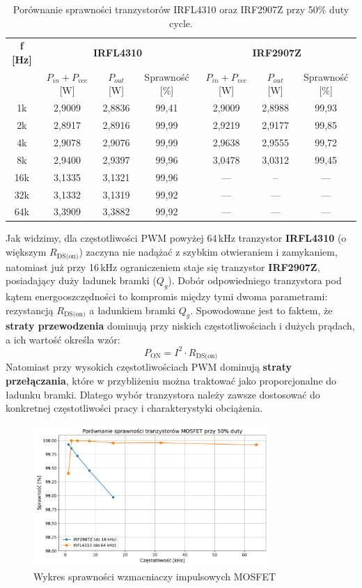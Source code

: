 \documentclass[11pt]{article}
\begin{document}
\begin{table}[H]
\centering
\begin{tabular}{|c|c|c|c|c|c|c|}
\hline
\textbf{f [Hz]} & \multicolumn{3}{c|}{\textbf{IRFL4310}} & \multicolumn{3}{c|}{\textbf{IRF2907Z}} \\
\cline{2-7}
 & $P_{in}+P_{vcc}$ [W] & $P_{out}$ [W] & Sprawność [\%] & $P_{in}+P_{vcc}$ [W] & $P_{out}$ [W] & Sprawność [\%] \\
\hline
1k   & 2,9009 & 2,8836 & 99,41 & 2,9009 & 2,8988 & 99,93 \\
\hline
2k   & 2,8917 & 2,8916 & 99,99 & 2,9219 & 2,9177 & 99,85 \\
\hline
4k   & 2,9078 & 2,9076 & 99,99 & 2,9638 & 2,9555 & 99,72 \\
\hline
8k   & 2,9400 & 2,9397 & 99,96 & 3,0478 & 3,0312 & 99,45 \\
\hline
16k  & 3,1335 & 3,1321 & 99,96 & --- & -- & --- \\
\hline
32k  & 3,1332 & 3,1319 & 99,92 & --- & --- & --- \\
\hline
64k  & 3,3909 & 3,3882 & 99,92 & --- & --- & --- \\
\hline
\end{tabular}
\caption{Porównanie sprawności tranzystorów IRFL4310 oraz IRF2907Z przy 50\% duty cycle.}
\end{table}

Jak widzimy, dla częstotliwości PWM powyżej 64\,kHz tranzystor \textbf{IRFL4310} (o większym $R_{\text{DS(on)}}$) zaczyna nie nadążać z szybkim otwieraniem i zamykaniem, natomiast już przy 16\,kHz ograniczeniem staje się tranzystor \textbf{IRF2907Z}, posiadający duży ładunek bramki ($Q_g$).
Dobór odpowiedniego tranzystora pod kątem energooszczędności to kompromis między tymi dwoma parametrami: rezystancją $R_{\text{DS(on)}}$ a ładunkiem bramki $Q_g$.
Spowodowane jest to faktem, że \textbf{straty przewodzenia} dominują przy niskich częstotliwościach i dużych prądach, a ich wartość określa wzór:
\[
P_{\text{ON}} = I^2 \cdot R_{\text{DS(on)}}
\]
Natomiast przy wysokich częstotliwościach PWM dominują \textbf{straty przełączania}, które w przybliżeniu można traktować jako proporcjonalne do ładunku bramki.
Dlatego wybór tranzystora należy zawsze dostosować do konkretnej częstotliwości pracy i charakterystyki obciążenia.\\

\begin{figure}[H]
\centering
\includegraphics[width=0.8\textwidth]{aun1_imp_mosfet_comparison.pdf}
\caption{Wykres sprawności wzmacniaczy impulsowych MOSFET}
\end{figure}
\end{document}

